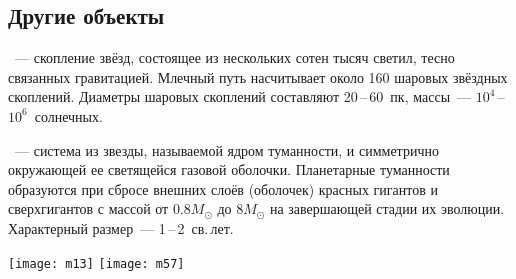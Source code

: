 \subsection{Другие объекты}
\begin{minipage}{0.63\tw}
~--- скопление звёзд, состоящее из нескольких сотен тысяч светил, тесно связанных гравитацией. Млечный путь насчитывает около 160 шаровых звёздных скоплений. Диаметры шаровых скоплений составляют 20\,--\,60~пк, массы~--- $10^4$\,--\,$10^6$~солнечных.\par

~--- система из звезды, называемой ядром туманности, и симметрично окружающей ее светящейся газовой оболочки. Планетарные туманности образуются при сбросе внешних слоёв (оболочек) красных гигантов и сверхгигантов с массой от $0.8M_\odot$ до $8M_\odot$ на завершающей стадии их эволюции. Характерный размер~--- 1\,--\,2~св.\,лет.
\end{minipage}
\hfill
\begin{minipage}{0.32\tw}
	\centering
	\vspace{-1.2pc}
	\texttt{[image: m13]}
	\vspace{1pc}
	\texttt{[image: m57]}
\end{minipage}
